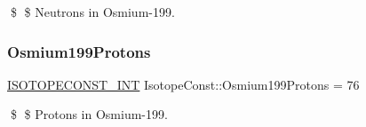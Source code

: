 \$ \$ Neutrons in Osmium-\/199. \mbox{\label{group___isotope_const-_osmium-_os199_gac4b725d8f628cd00d95f6f88ea95aa0c}} 
\subsubsection{\texorpdfstring{Osmium199\+Protons}{Osmium199Protons}}
{\footnotesize\ttfamily \mbox{\hyperlink{group___isotope_const-_macros_ga5f18360b3e99483a35c32d789e62621c}{I\+S\+O\+T\+O\+P\+E\+C\+O\+N\+S\+T\+\_\+\+I\+NT}} Isotope\+Const\+::\+Osmium199\+Protons = 76}

\$ \$ Protons in Osmium-\/199. 